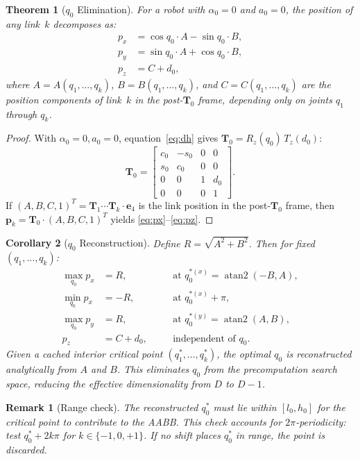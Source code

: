 \documentclass[11pt,a4paper]{article}
\newtheorem{theorem}{Theorem}[section]
\newtheorem{corollary}[theorem]{Corollary}
\newtheorem{remark}{Remark}[section]
\newcommand{\bT}{\mathbf{T}}
\newcommand{\bp}{\mathbf{p}}
\DeclareMathOperator{\atantwo}{atan2}
\begin{document}
\begin{theorem}[$q_0$ Elimination]\label{thm:q0}
For a robot with $\alpha_0 = 0$ and $a_0 = 0$, the position of any
link~$k$ decomposes as:
\begin{align}
  p_x &= \cos q_0 \cdot A - \sin q_0 \cdot B, \label{eq:px}\\
  p_y &= \sin q_0 \cdot A + \cos q_0 \cdot B, \label{eq:py}\\
  p_z &= C + d_0, \label{eq:pz}
\end{align}
where $A = A(q_1,\ldots,q_k)$, $B = B(q_1,\ldots,q_k)$, and
$C = C(q_1,\ldots,q_k)$ are the position components of link~$k$
in the post-$\bT_0$ frame, depending only on joints $q_1$ through $q_k$.
\end{theorem}

\begin{proof}
With $\alpha_0 = 0, a_0 = 0$, equation~\eqref{eq:dh} gives
$\bT_0 = R_z(q_0)\,T_z(d_0)$:
\[
  \bT_0 = \begin{bmatrix}
    c_0 & -s_0 & 0 & 0 \\
    s_0 &  c_0 & 0 & 0 \\
    0   &  0   & 1 & d_0 \\
    0   &  0   & 0 & 1
  \end{bmatrix}.
\]
If $(A, B, C, 1)^T = \bT_1\cdots\bT_k \cdot \mathbf{e}_4$ is the
link position in the post-$\bT_0$ frame, then
$\bp_k = \bT_0 \cdot (A, B, C, 1)^T$ yields \eqref{eq:px}--\eqref{eq:pz}.
\end{proof}

\begin{corollary}[$q_0$ Reconstruction]\label{cor:q0_recon}
Define $R = \sqrt{A^2 + B^2}$. Then for fixed $(q_1,\ldots,q_k)$:
\begin{align*}
  \max_{q_0} p_x &= R, &\quad &\text{at } q_0^{*(x)} = \atantwo(-B, A), \\
  \min_{q_0} p_x &= -R, &\quad &\text{at } q_0^{*(x)} + \pi, \\
  \max_{q_0} p_y &= R, &\quad &\text{at } q_0^{*(y)} = \atantwo(A, B), \\
  p_z &= C + d_0, &\quad &\text{independent of } q_0.
\end{align*}
Given a cached interior critical point $(q_1^*,\ldots,q_k^*)$, the
optimal $q_0$ is reconstructed analytically from $A$ and $B$.
This eliminates $q_0$ from the precomputation search space, reducing
the effective dimensionality from $D$ to $D-1$.
\end{corollary}

\begin{remark}[Range check]
The reconstructed $q_0^*$ must lie within $[l_0, h_0]$ for the
critical point to contribute to the AABB.
This check accounts for $2\pi$-periodicity:
test $q_0^* + 2k\pi$ for $k \in \{-1, 0, +1\}$.
If no shift places $q_0^*$ in range, the point is discarded.
\end{remark}
\end{document}
